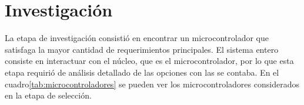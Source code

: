 \documentclass{article}
\theoremstyle{definition}
\theoremstyle{remark}
\begin{document}


\section{Investigación} %
\label{sec:investigacion}

La etapa de investigación consistió en encontrar un microcontrolador que satisfaga la mayor cantidad de requerimientos principales. El sistema entero consiste en interactuar con el núcleo, que es el microcontrolador, por lo que esta etapa requirió de análisis detallado de las opciones con las se contaba. En el cuadro\ref{tab:microcontroladores} se pueden ver los microcontroladores considerados en la etapa de selección.

\clearpage
\end{document}
